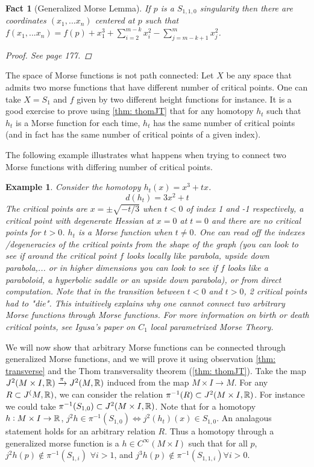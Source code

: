 \documentclass{article}
\newtheorem{fact}[theorem]{Fact}
\newtheorem{example}[theorem]{Example}
\newtheorem{proposed work}[theorem]{Proposed Work}
\theoremstyle{definition}
\begin{document}
\begin{fact}[Generalized Morse Lemma]
If $p$ is a $S_{1,1,0}$ singularity then there are coordinates $(x_1,...x_n)$ centered at $p$ such that $f(x_1,...x_n)=f(p)+x_1^3+\sum_{i=2}^{m-k} x_i^2 -\sum_{j=m-k+1}^m x_j^2$.
\begin{proof}
See \cite{strata} page 177.  
\end{proof}

\end{fact}

The space of Morse functions is not path connected:  Let $X$ be any space that admits two morse functions that have different number of critical points.  One can take $X=S_1$ and $f$ given by two different height functions for instance.  It is a good exercise to prove using \ref{thm: thomJT} that for any homotopy $h_t$ such that $h_t$ is a Morse function for each time, $h_t$ has the same number of critical points (and in fact has the same number of critical points of a given index).

The following example illustrates what happens when trying to connect two Morse functions with differing number of critical points.  
\begin{example}
Consider the homotopy $h_t(x)=x^3+tx$.  \[d(h_t)=3x^2+t\]
The critical points are  $x=\pm  \sqrt{-t/3}$ when $t<0$ of index 1 and -1 respectively,  a critical point with degenerate Hessian at $x=0$ at $t=0$ and there are no critical points for $t>0$.  $h_t$ is a Morse function when $t \neq 0$.  One can read off the indexes /degeneracies of the critical points from the shape of the graph (you can look to see if around the critical point $f$ looks locally like parabola, upside down parabola,... or in higher dimensions you can look to see if $f$ looks like a paraboloid, a hyperbolic saddle or an upside down parabola), or from direct computation.  Note that in the transition between $t<0$ and $t>0$, 2 critical points had to "die".  This intuitively explains why one cannot connect two arbitrary Morse functions through Morse functions. For more information on birth or death critical points, see Igusa's paper on $C_1$ local parametrized Morse Theory.

\end{example}

We will now show that arbitrary Morse functions can be connected through generalized Morse functions, and we will prove it using observation \ref{thm: transverse} and the Thom transversality theorem (\ref{thm: thomJT}).  Take the map $J^2(M \times I, \mathbb R) \xrightarrow{\pi}  J^2(M,\mathbb R)$ induced from the map $M \times I  \to M$. For any $R \subset J^(M, \mathbb R)$, we can consider the relation $\pi^{-1}(R) \subset J^2(M \times I, \mathbb R)$.  For instance we could take $\pi^{-1}( S_{1,0}) \subset J^2(M \times I, \mathbb R)$.  Note that for a homotopy $h: M \times I \to \mathbb R$, $j^2 h \in \pi^{-1}(S_{1,0}) \iff j^2(h_t)(x) \in S_{1,0}$.  An analagous statement holds for an arbitrary relation $R$. Thus a homotopy through a generalized morse function is a $h \in C^\infty(M \times I)$ such that for all $p$,  $j^2 h(p) \notin \pi^{-1}(S_{1,i})$ $\forall i>1$, and $j^3 h(p) \notin \pi^{-1}(S_{1,1,i}) \forall i>0$.
\end{document}

